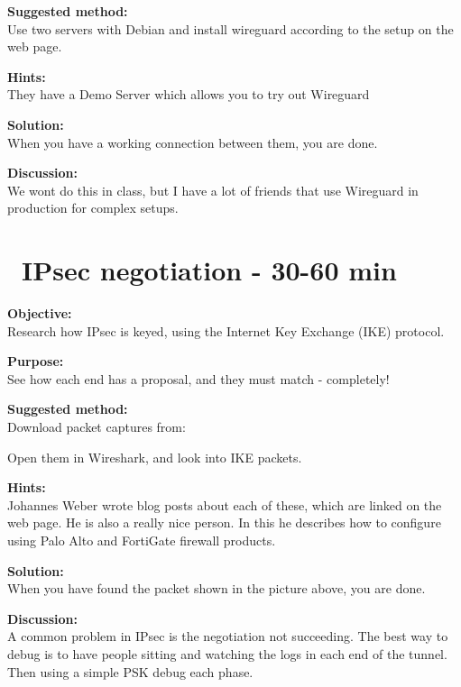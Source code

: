 \documentclass[a4paper,11pt,notitlepage]{report}
\begin{document}
{\bf Suggested method:}\\
Use two servers with Debian and install wireguard according to the setup on the web page.



{\bf Hints:}\\
They have a Demo Server which allows you to try out Wireguard

{\bf Solution:}\\
When you have a working connection between them, you are done.

{\bf Discussion:}\\
We wont do this in class, but I have a lot of friends that use Wireguard in production for complex setups.



\chapter{\faInfoCircle\ IPsec negotiation - 30-60 min}
\label{ex:-ipsec-wireshark}


{\bf Objective:}\\
Research how IPsec is keyed, using the Internet Key Exchange (IKE) protocol.

{\bf Purpose:}\\
See how each end has a proposal, and they must match - completely!

{\bf Suggested method:}\\
Download packet captures from:

Open them in Wireshark, and look into IKE packets.

{\bf Hints:}\\
Johannes Weber wrote blog posts about each of these, which are linked on the web page. He is also a really nice person.
In this he describes how to configure using Palo Alto and FortiGate firewall products.

{\bf Solution:}\\
When you have found the packet shown in the picture above, you are done.

{\bf Discussion:}\\
A common problem in IPsec is the negotiation not succeeding.
The best way to debug is to have people sitting and watching the logs in each end of the tunnel. Then using a simple PSK debug each phase.
\end{document}
